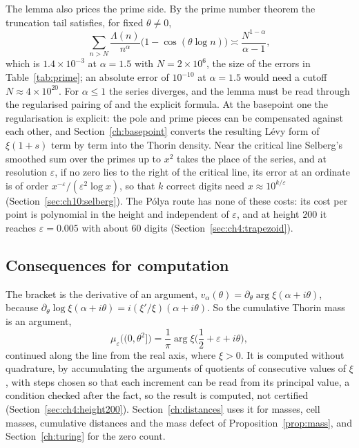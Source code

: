 The lemma also prices the prime side. By the prime number theorem the truncation tail satisfies, for fixed $\theta\ne0$,
\[
\sum_{n>N}\frac{\Lambda(n)}{n^\alpha}\big(1-\cos(\theta\log n)\big)\asymp\frac{N^{1-\alpha}}{\alpha-1},
\]
which is $1.4\times10^{-3}$ at $\alpha=1.5$ with $N=2\times10^6$, the size of the errors in Table~\ref{tab:prime}; an absolute error of $10^{-10}$ at $\alpha=1.5$ would need a cutoff $N\approx4\times10^{20}$. For $\alpha\le1$ the series diverges, and the lemma must be read through the regularised pairing of \cite[Chapter 7]{P26} and the explicit formula. At the basepoint one the regularisation is explicit: the pole and prime pieces can be compensated against each other, and Section~\ref{ch:basepoint} converts the resulting L\'evy form of $\xi(1+s)$ term by term into the Thorin density. Near the critical line Selberg's smoothed sum over the primes up to $x^2$ takes the place of the series, and at resolution $\varepsilon$, if no zero lies to the right of the critical line, its error at an ordinate is of order $x^{-\varepsilon}/(\varepsilon^2\log x)$, so that $k$ correct digits need $x\approx10^{k/\varepsilon}$ (Section~\ref{sec:ch10:selberg}). The P\'olya route has none of these costs: its cost per point is polynomial in the height and independent of $\varepsilon$, and at height $200$ it reaches $\varepsilon=0.005$ with about $60$ digits (Section~\ref{sec:ch4:trapezoid}).

\subsection{Consequences for computation}\label{sec:ch6:consequences}

The bracket is the derivative of an argument, $v_\alpha(\theta)=\partial_\theta\arg\xi(\alpha+i\theta)$, because $\partial_\theta\log\xi(\alpha+i\theta)=i(\xi'/\xi)(\alpha+i\theta)$. So the cumulative Thorin mass is an argument,
\[
\mu_\varepsilon\big((0,\theta^2]\big)=\frac1\pi\arg\xi\Big(\frac12+\varepsilon+i\theta\Big),
\]
continued along the line from the real axis, where $\xi>0$. It is computed without quadrature, by accumulating the arguments of quotients of consecutive values of $\xi$, with steps chosen so that each increment can be read from its principal value, a condition checked after the fact, so the result is computed, not certified (Section~\ref{sec:ch4:height200}). Section~\ref{ch:distances} uses it for masses, cell masses, cumulative distances and the mass defect of Proposition~\ref{prop:mass}, and Section~\ref{ch:turing} for the zero count.

